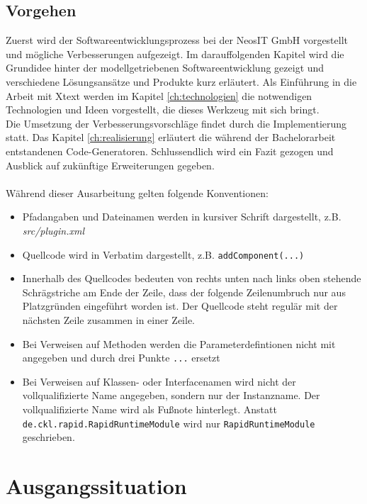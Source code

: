 \documentclass[a4paper,12pt]{scrreprt}
\begin{document}
\section{Vorgehen}
Zuerst wird der Softwareentwicklungsprozess bei der NeosIT GmbH vorgestellt und mögliche Verbesserungen aufgezeigt.
Im darauffolgenden Kapitel wird die Grundidee hinter der modellgetriebenen Softwareentwicklung gezeigt und verschiedene Lö\-sungs\-an\-sätze und Produkte kurz erläutert. Als Einführung in die Arbeit mit Xtext werden im Kapitel \ref{ch:technologien} die notwendigen Technologien und Ideen vorgestellt, die dieses Werkzeug mit sich bringt.\\
Die Umsetzung der Verbesserungsvorschläge findet durch die Implementierung statt. Das Kapitel \ref{ch:realisierung} erläutert die während der Bachelorarbeit entstandenen Code-Generatoren.
Schlussendlich wird ein Fazit gezogen und Ausblick auf zukünftige Erweiterungen gegeben.
\\
\\
Während dieser Ausarbeitung gelten folgende Konventionen:
\begin{itemize}
	\item Pfadangaben und Dateinamen werden in kursiver Schrift dargestellt, z.B. \textit{src/plugin.xml}
	\item Quellcode wird in Verbatim dargestellt, z.B. \texttt{addComponent(...)}
	\item Innerhalb des Quellcodes bedeuten von rechts unten nach links oben stehende Schrägstriche am Ende der Zeile, dass der folgende Zeilenumbruch nur aus Platzgründen eingeführt worden ist. Der Quellcode steht regulär mit der nächsten Zeile zusammen in einer Zeile.
	\item Bei Verweisen auf Methoden werden die Parameterdefintionen nicht mit angegeben und durch drei Punkte \texttt{...} ersetzt
	\item Bei Verweisen auf Klassen- oder Interfacenamen wird nicht der vollqualifizierte Name angegeben, sondern nur der Instanzname. Der vollqualifizierte Name wird als Fußnote hinterlegt. Anstatt \texttt{de.ckl.rapid.RapidRuntimeModule} wird nur \texttt{RapidRuntimeModule} geschrieben.
\end{itemize}

\chapter{Ausgangssituation}
\end{document}
